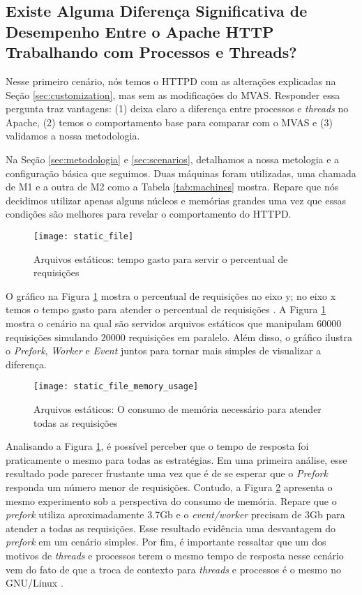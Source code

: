 \subsection{Existe Alguma Diferença Significativa de Desempenho Entre o Apache
HTTP Trabalhando com Processos e Threads?}

Nesse primeiro cenário, nós temos o HTTPD com as alterações explicadas na Seção
\ref{sec:customization}, mas sem as modificações do MVAS. Responder essa
pergunta traz vantagens: (1) deixa claro a diferença entre processos e \emph{threads}
no Apache, (2) temos o comportamento base para comparar com o MVAS e (3)
validamos a nossa metodologia.



Na Seção \ref{sec:metodologia} e \ref{sec:scenarios}, detalhamos a nossa
metologia e a configuração básica que seguimos. Duas máquinas foram utilizadas,
uma chamada de M1 e a outra de M2 como a Tabela \ref{tab:machines} mostra.
Repare que nós decidimos utilizar apenas alguns núcleos e memórias grandes uma
vez que essas condições são melhores para revelar o comportamento do HTTPD.

\begin{figure}[!h]
  \centering
  \texttt{[image: static\_file]}

  \caption{Arquivos estáticos: tempo gasto para servir o percentual de requisições}
  \label{fig:static_file}
\end{figure}

O gráfico na Figura \ref{fig:static_file} mostra o percentual de requisições no
eixo y; no eixo x temos o tempo gasto para atender o percentual de requisições
\citep{apache_ab}. A Figura \ref{fig:static_file} mostra o cenário na qual são
servidos arquivos estáticos que manipulam 60000 requisições simulando 20000
requisições em paralelo. Além disso, o gráfico ilustra o \emph{Prefork},
\emph{Worker} e \emph{Event} juntos para tornar mais simples de visualizar a
diferença.

\begin{figure}[!h]
  \centering
  \texttt{[image: static\_file\_memory\_usage]}

  \caption{Arquivos estáticos: O consumo de memória necessário para atender todas as requisições}
  \label{fig:static_file_memory}
\end{figure}
 
Analisando a Figura \ref{fig:static_file}, é possível perceber que o tempo de
resposta foi praticamente o mesmo para todas as estratégias. Em uma primeira
análise, esse resultado pode parecer frustante uma vez que é de se esperar que
o \emph{Prefork} responda um número menor de requisições. Contudo, a Figura
\ref{fig:static_file_memory} apresenta o mesmo experimento sob a perspectiva do
consumo de memória. Repare que o \emph{prefork} utiliza aproximadamente 3.7Gb e
o \emph{event/worker} precisam de 3Gb para atender a todas as requisições. Esse
resultado evidência uma desvantagem do \emph{prefork} em um cenário simples.
Por fim, é importante ressaltar que um dos motivos de \emph{threads} e
processos terem o mesmo tempo de resposta nesse cenário vem do fato de que a
troca de contexto para \emph{threads} e processos é o mesmo no GNU/Linux
\citep{love}.

